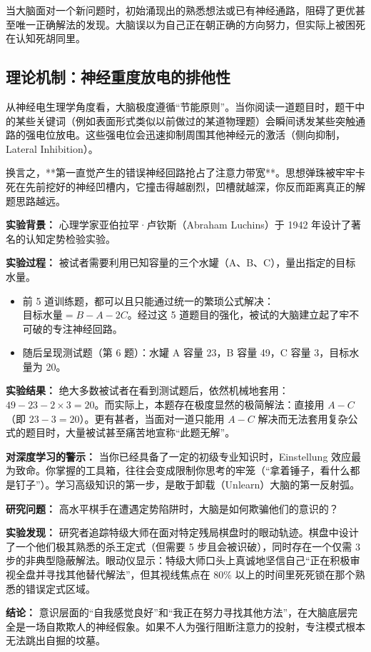 \documentclass[12pt,a4paper,openany]{ctexbook}
\begin{document}
\begin{keypoint}
当大脑面对一个新问题时，初始涌现出的熟悉想法或已有神经通路，阻碍了更优甚至唯一正确解法的发现。大脑误以为自己正在朝正确的方向努力，但实际上被困死在认知死胡同里。
\end{keypoint}

\subsection*{理论机制：神经重度放电的排他性}

从神经电生理学角度看，大脑极度遵循“节能原则”。当你阅读一道题目时，题干中的某些关键词（例如表面形式类似以前做过的某道物理题）会瞬间诱发某些突触通路的强电位放电。这些强电位会迅速抑制周围其他神经元的激活（侧向抑制，Lateral Inhibition）。

换言之，**第一直觉产生的错误神经回路抢占了注意力带宽**。思想弹珠被牢牢卡死在先前挖好的神经凹槽内，它撞击得越剧烈，凹槽就越深，你反而距离真正的解题思路越远。

\begin{casebox}
\textbf{实验背景：} 心理学家亚伯拉罕·卢钦斯（Abraham Luchins）于 1942 年设计了著名的认知定势检验实验。

\textbf{实验过程：}
被试者需要利用已知容量的三个水罐（A、B、C），量出指定的目标水量。
\begin{itemize}
    \item 前 5 道训练题，都可以且只能通过统一的繁琐公式解决：$目标水量 = B - A - 2C$。经过这 5 道题目的强化，被试的大脑建立起了牢不可破的专注神经回路。
    \item 随后呈现测试题（第 6 题）：水罐 A 容量 23，B 容量 49，C 容量 3，目标水量为 20。
\end{itemize}

\textbf{实验结果：}
绝大多数被试者在看到测试题后，依然机械地套用：$49 - 23 - 2 \times 3 = 20$。而实际上，本题存在极度显然的极简解法：直接用 $A - C$（即 $23 - 3 = 20$）。更有甚者，当面对一道只能用 $A - C$ 解决而无法套用复杂公式的题目时，大量被试甚至痛苦地宣称“此题无解”。

\textbf{对深度学习的警示：}
当你已经具备了一定的初级专业知识时，Einstellung 效应最为致命。你掌握的工具箱，往往会变成限制你思考的牢笼（“拿着锤子，看什么都是钉子”）。学习高级知识的第一步，是敢于卸载（Unlearn）大脑的第一反射弧。
\end{casebox}

\begin{casebox}[国际象棋大师的眼动追踪实验]
\textbf{研究问题：} 高水平棋手在遭遇定势陷阱时，大脑是如何欺骗他们的意识的？

\textbf{实验发现：}
研究者追踪特级大师在面对特定残局棋盘时的眼动轨迹。棋盘中设计了一个他们极其熟悉的杀王定式（但需要 5 步且会被识破），同时存在一个仅需 3 步的非典型隐蔽解法。眼动仪显示：特级大师口头上真诚地坚信自己“正在积极审视全盘并寻找其他替代解法”，但其视线焦点在 80\% 以上的时间里死死锁在那个熟悉的错误定式区域。

\textbf{结论：}
意识层面的“自我感觉良好”和“我正在努力寻找其他方法”，在大脑底层完全是一场自欺欺人的神经假象。如果不人为强行阻断注意力的投射，专注模式根本无法跳出自掘的坟墓。
\end{casebox}
\end{document}
